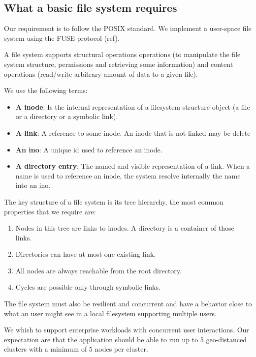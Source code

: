 \documentclass[sigplan, 10pt]{acmart}
\begin{document}
\subsection{What a basic file system requires}

Our requirement is to follow the POSIX standard.  We implement
a user-space file system using the FUSE protocol (ref).

A file system supports structural operations operations (to manipulate the file system
structure, permissions and retrieving some information) and content operations
(read/write arbitrary amount of data to a given file).

We use the following terms:

\begin{itemize}
    \item \textbf{A inode}: Is the internal representation of a filesystem
    structure object (a file or a directory or a symbolic link).
    \item \textbf{A link}: A reference to some inode. An inode that is not
    linked may be delete
    \item \textbf{An ino}: A unique id used to reference an inode.
    \item \textbf{A directory entry}: The named and visible representation
    of a link. When a name is used to reference an inode,
    the system resolve internally the name into an ino.
\end{itemize}

The key structure of a file system is its tree hierarchy, the most common
properties that we require are:

\begin{enumerate}
    \item Nodes in this tree are links to inodes. A directory is a container
    of those links.
    \item Directories can have at most one existing link.
    \item All nodes are always reachable from the root directory.
    \item Cycles are possible only through symbolic links.
\end{enumerate}

The file system must also be resilient and concurrent and
have a behavior close to what an user might see in a local filesystem
supporting multiple users.

We whish to support enterprise workloads with concurrent user interactions. Our
expectation are that the application should be able to run up to 5
geo-distanced clusters with a minimum of 5 nodes per cluster.
\end{document}
